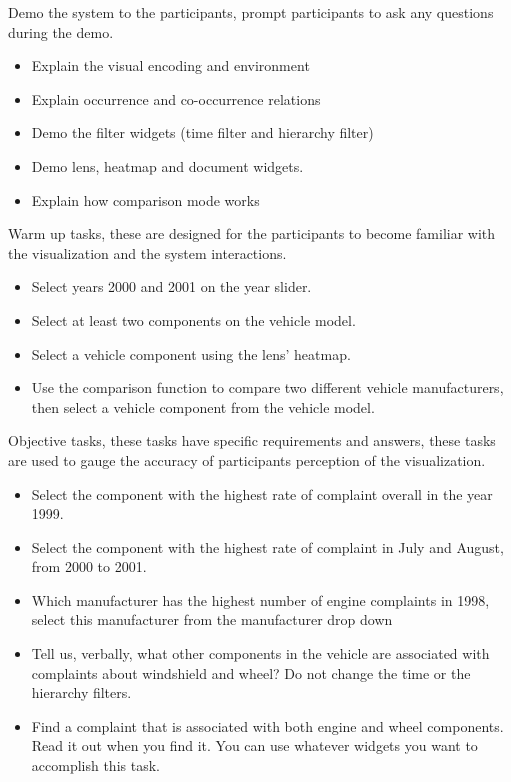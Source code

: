 \noindent
Demo the system to the participants, prompt participants to ask any questions
during the demo.
\begin{itemize}[noitemsep]
  \item Explain the visual encoding and \threed environment
  \item Explain occurrence and co-occurrence relations
  \item Demo the filter widgets (time filter and hierarchy filter)
  \item Demo lens, heatmap and document widgets.
  \item Explain how comparison mode works
\end{itemize}


\noindent 
Warm up tasks, these are designed for the participants to become
familiar with the visualization and the system interactions.
\begin{itemize}[noitemsep]
  \item Select years 2000 and 2001 on the year slider.
  \item Select at least two components on the \threed vehicle model.
  \item Select a vehicle component using the lens' heatmap.
  \item Use the comparison function to compare two different vehicle
  manufacturers, then select a vehicle component from the \threed vehicle model.
\end{itemize}
 


\noindent 
Objective tasks, these tasks have specific requirements and answers, these tasks
are used to gauge the accuracy of participants perception of the \threed
visualization.

\begin{itemize}[noitemsep]
  \item Select the component with the highest rate of complaint overall in the
  year 1999.
  \item Select the component with the highest rate of complaint in July and
  August, from 2000 to 2001.
  \item Which manufacturer has the highest number of engine complaints in 1998,
  select this manufacturer from the manufacturer drop down
  \item Tell us, verbally, what other components in the vehicle are associated
  with complaints about windshield and wheel? Do not change the time or the
  hierarchy filters.
  \item Find a complaint that is associated with both engine and wheel
  components. Read it out when you find it. You can use whatever widgets  you
  want to accomplish this task.
\end{itemize}


